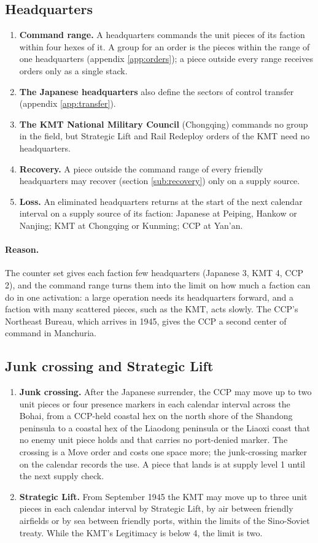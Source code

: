 \documentclass[11pt]{article}
\begin{document}
\subsection{Headquarters}\label{app:hq}
\draft
\begin{enumerate}
\item \textbf{Command range.} A headquarters commands the unit pieces of its faction within four hexes of it. A group for an order is the pieces within the range of one headquarters (appendix \ref{app:orders}); a piece outside every range receives orders only as a single stack.
\item \textbf{The Japanese headquarters} also define the sectors of control transfer (appendix \ref{app:transfer}).
\item \textbf{The KMT National Military Council} (Chongqing) commands no group in the field, but Strategic Lift and Rail Redeploy orders of the KMT need no headquarters.
\item \textbf{Recovery.} A piece outside the command range of every friendly headquarters may recover (section \ref{sub:recovery}) only on a supply source.
\item \textbf{Loss.} An eliminated headquarters returns at the start of the next calendar interval on a supply source of its faction: Japanese at Peiping, Hankow or Nanjing; KMT at Chongqing or Kunming; CCP at Yan'an.
\end{enumerate}
\paragraph{Reason.} The counter set gives each faction few headquarters (Japanese 3, KMT 4, CCP 2), and the command range turns them into the limit on how much a faction can do in one activation: a large operation needs its headquarters forward, and a faction with many scattered pieces, such as the KMT, acts slowly. The CCP's Northeast Bureau, which arrives in 1945, gives the CCP a second center of command in Manchuria.

\subsection{Junk crossing and Strategic Lift}\label{app:junks}
\draft
\begin{enumerate}
\item \textbf{Junk crossing.} After the Japanese surrender, the CCP may move up to two unit pieces or four presence markers in each calendar interval across the Bohai, from a CCP-held coastal hex on the north shore of the Shandong peninsula to a coastal hex of the Liaodong peninsula or the Liaoxi coast that no enemy unit piece holds and that carries no port-denied marker. The crossing is a Move order and costs one space more; the junk-crossing marker on the calendar records the use. A piece that lands is at supply level 1 until the next supply check.
\item \textbf{Strategic Lift.} From September 1945 the KMT may move up to three unit pieces in each calendar interval by Strategic Lift, by air between friendly airfields or by sea between friendly ports, within the limits of the Sino-Soviet treaty. While the KMT's Legitimacy is below 4, the limit is two.
\end{enumerate}
\end{document}

